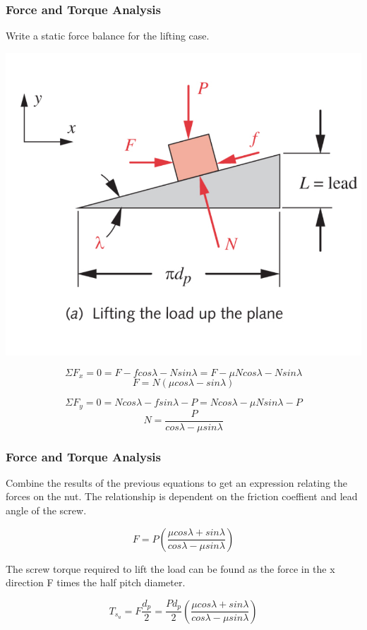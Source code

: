 \documentclass[fleqn]{beamer} %
\newcommand{\sectiontitleIII}{Force and Torque Analysis}
\begin{document}
	\begin{frame}[label=sectionIII] \small
		\frametitle{\sectiontitleIII}
		
		

		\begin{multicols}{2}
			Write a static force balance for the lifting case.

			\includegraphics[scale=.12]{images/figure_15_6_a.png}
		\end{multicols}

			\[\Sigma F_x = 0 = F - f cos\lambda -N sin\lambda = F - \mu N cos\lambda - N sin\lambda \]	
			\[F=N(\mu cos\lambda-sin\lambda)\]	

			\[\Sigma F_y = 0 = N cos\lambda - f sin\lambda - P = N cos\lambda -\mu N sin\lambda - P \]
			\[N=\frac{P}{cos\lambda - \mu sin\lambda}\]
	        
	\end{frame}  

	\begin{frame}[label=sectionIII] \small
		\frametitle{\sectiontitleIII}
	 		
		Combine the results of the previous equations to get an expression relating the forces on the nut. The relationship is dependent on the friction coeffient and lead angle of the screw. 

		\[F = P \left( \frac{\mu cos\lambda +sin\lambda}{cos\lambda - \mu sin \lambda} \right)\]
		
		The screw torque required to lift the load can be found as the force in the x direction F times the half pitch diameter.  	

		\[T_{s_u} = F \frac{d_p}{2} = \frac{Pd_p}{2} \left( \frac{\mu cos\lambda +sin\lambda}{cos\lambda - \mu sin \lambda} \right)\]


	\end{frame}  
	
\end{document}
